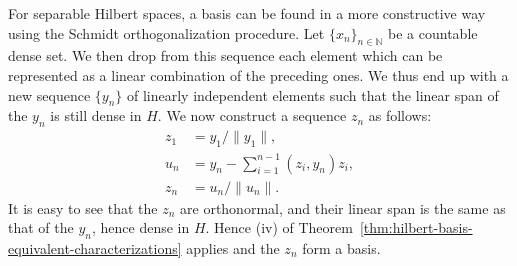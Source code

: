 For separable Hilbert spaces, a basis can be found in a more constructive way using the Schmidt orthogonalization procedure. Let $\{x_n\}_{n\in\mathbb{N}}$ be a countable dense set. We then drop from this sequence each element which can be represented as a linear combination of the preceding ones. We thus end up with a new sequence $\{y_n\}$ of linearly independent elements such that the linear span of the $y_n$ is still dense in $H$. We now construct a sequence $z_n$ as follows:
\begin{equation}\label{eq:schmidt-orthogonalization-recursion}
\begin{aligned}
z_1&=y_1/\|y_1\|,\\
u_n&=y_n-\sum_{i=1}^{n-1}(z_i,y_n)z_i,\\
z_n&=u_n/\|u_n\|.
\end{aligned}
\end{equation}
It is easy to see that the $z_n$ are orthonormal, and their linear span is the same as that of the $y_n$, hence dense in $H$. Hence (iv) of Theorem~\ref{thm:hilbert-basis-equivalent-characterizations} applies and the $z_n$ form a basis.
